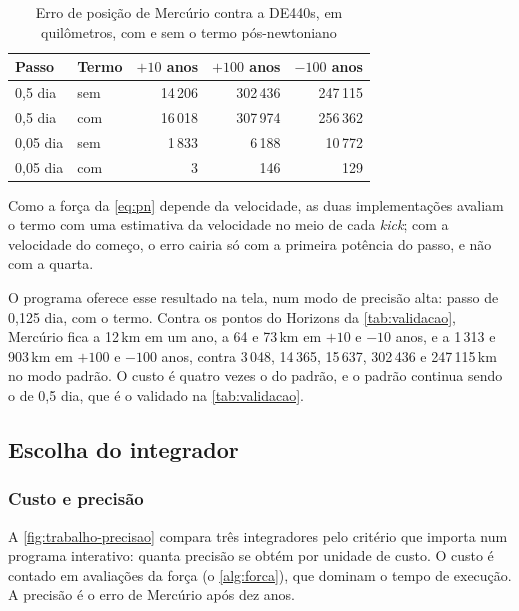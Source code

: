 \begin{table}[htb]
  \centering
  \caption{Erro de posição de Mercúrio contra a DE440s, em quilômetros, com e sem o termo pós-newtoniano}
  \label{tab:relatividade}
  \small
  \begin{tabular}{llrrr}
    \toprule
    Passo & Termo & $+10$ anos & $+100$ anos & $-100$ anos \\
    \midrule
    0,5 dia & sem & 14\,206 & 302\,436 & 247\,115 \\
    0,5 dia & com & 16\,018 & 307\,974 & 256\,362 \\
    0,05 dia & sem & 1\,833 & 6\,188 & 10\,772 \\
    0,05 dia & com & 3 & 146 & 129 \\
    \bottomrule
  \end{tabular}
\end{table}

Como a força da \autoref{eq:pn} depende da velocidade, as duas implementações avaliam o termo com uma estimativa da velocidade no meio de cada \emph{kick}; com a velocidade do começo, o erro cairia só com a primeira potência do passo, e não com a quarta.

O programa oferece esse resultado na tela, num modo de precisão alta: passo de 0,125 dia, com o termo. Contra os pontos do Horizons da \autoref{tab:validacao}, Mercúrio fica a 12\,km em um ano, a 64 e 73\,km em $+10$ e $-10$ anos, e a 1\,313 e 903\,km em $+100$ e $-100$ anos, contra 3\,048, 14\,365, 15\,637, 302\,436 e 247\,115\,km no modo padrão. O custo é quatro vezes o do padrão, e o padrão continua sendo o de 0,5 dia, que é o validado na \autoref{tab:validacao}.

\subsection{Escolha do integrador}\label{sec:res-integradores}

\subsubsection{Custo e precisão}

A \autoref{fig:trabalho-precisao} compara três integradores pelo critério que importa num programa interativo: quanta precisão se obtém por unidade de custo. O custo é contado em avaliações da força (o \autoref{alg:forca}), que dominam o tempo de execução. A precisão é o erro de Mercúrio após dez anos.

